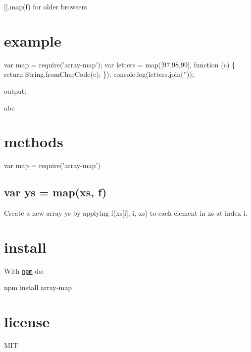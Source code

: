 {\ttfamily \mbox{[}\mbox{]}.map(f)} for older browsers

\href{https://ci.testling.com/substack/array-map}{\tt }

\href{http://travis-ci.org/substack/array-map}{\tt }

\section*{example}


\begin{DoxyCode}
var map = require('array-map');
var letters = map([97,98,99], function (c) \{
    return String.fromCharCode(c);
\});
console.log(letters.join(''));
\end{DoxyCode}


output\+:


\begin{DoxyCode}
abc
\end{DoxyCode}


\section*{methods}


\begin{DoxyCode}
var map = require('array-map')
\end{DoxyCode}


\subsection*{var ys = map(xs, f)}

Create a new array {\ttfamily ys} by applying {\ttfamily f(xs\mbox{[}i\mbox{]}, i, xs)} to each element in {\ttfamily xs} at index {\ttfamily i}.

\section*{install}

With \href{https://npmjs.org}{\tt npm} do\+:


\begin{DoxyCode}
npm install array-map
\end{DoxyCode}


\section*{license}

M\+IT 